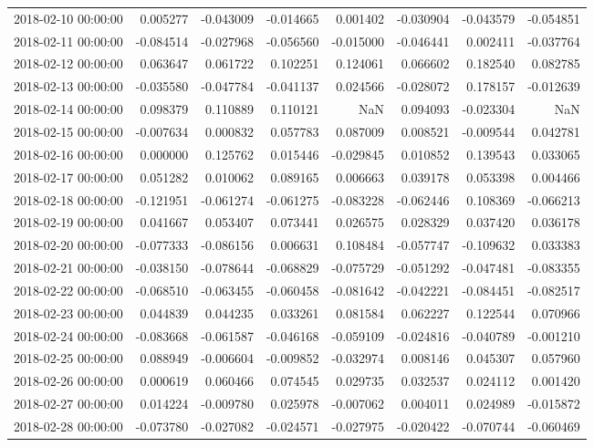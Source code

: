 \begin{tabular}{lrrrrrrr}
2018-02-10 00:00:00 & 0.005277 & -0.043009 & -0.014665 & 0.001402 & -0.030904 & -0.043579 & -0.054851 \\
2018-02-11 00:00:00 & -0.084514 & -0.027968 & -0.056560 & -0.015000 & -0.046441 & 0.002411 & -0.037764 \\
2018-02-12 00:00:00 & 0.063647 & 0.061722 & 0.102251 & 0.124061 & 0.066602 & 0.182540 & 0.082785 \\
2018-02-13 00:00:00 & -0.035580 & -0.047784 & -0.041137 & 0.024566 & -0.028072 & 0.178157 & -0.012639 \\
2018-02-14 00:00:00 & 0.098379 & 0.110889 & 0.110121 & NaN & 0.094093 & -0.023304 & NaN \\
2018-02-15 00:00:00 & -0.007634 & 0.000832 & 0.057783 & 0.087009 & 0.008521 & -0.009544 & 0.042781 \\
2018-02-16 00:00:00 & 0.000000 & 0.125762 & 0.015446 & -0.029845 & 0.010852 & 0.139543 & 0.033065 \\
2018-02-17 00:00:00 & 0.051282 & 0.010062 & 0.089165 & 0.006663 & 0.039178 & 0.053398 & 0.004466 \\
2018-02-18 00:00:00 & -0.121951 & -0.061274 & -0.061275 & -0.083228 & -0.062446 & 0.108369 & -0.066213 \\
2018-02-19 00:00:00 & 0.041667 & 0.053407 & 0.073441 & 0.026575 & 0.028329 & 0.037420 & 0.036178 \\
2018-02-20 00:00:00 & -0.077333 & -0.086156 & 0.006631 & 0.108484 & -0.057747 & -0.109632 & 0.033383 \\
2018-02-21 00:00:00 & -0.038150 & -0.078644 & -0.068829 & -0.075729 & -0.051292 & -0.047481 & -0.083355 \\
2018-02-22 00:00:00 & -0.068510 & -0.063455 & -0.060458 & -0.081642 & -0.042221 & -0.084451 & -0.082517 \\
2018-02-23 00:00:00 & 0.044839 & 0.044235 & 0.033261 & 0.081584 & 0.062227 & 0.122544 & 0.070966 \\
2018-02-24 00:00:00 & -0.083668 & -0.061587 & -0.046168 & -0.059109 & -0.024816 & -0.040789 & -0.001210 \\
2018-02-25 00:00:00 & 0.088949 & -0.006604 & -0.009852 & -0.032974 & 0.008146 & 0.045307 & 0.057960 \\
2018-02-26 00:00:00 & 0.000619 & 0.060466 & 0.074545 & 0.029735 & 0.032537 & 0.024112 & 0.001420 \\
2018-02-27 00:00:00 & 0.014224 & -0.009780 & 0.025978 & -0.007062 & 0.004011 & 0.024989 & -0.015872 \\
2018-02-28 00:00:00 & -0.073780 & -0.027082 & -0.024571 & -0.027975 & -0.020422 & -0.070744 & -0.060469 \\

\end{tabular}
